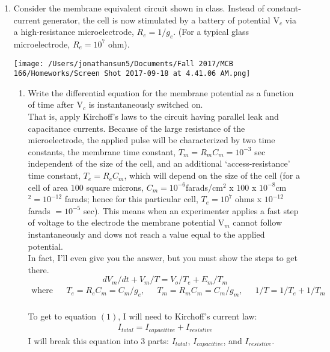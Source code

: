 \documentclass[11pt]{article}
\begin{document}
\begin{enumerate}[label=\arabic*.]
\newpage
\item
Consider the membrane equivalent circuit shown in class. Instead of constant-current generator, the cell is now stimulated by a battery of potential V$_c$ via a high-resistance microelectrode, $R_e = 1 / g_e$. (For a typical glass microelectrode, $R_e = 10^7$ ohm).
\begin{center}
\texttt{[image: /Users/jonathansun5/Documents/Fall 2017/MCB 166/Homeworks/Screen Shot 2017-09-18 at 4.41.06 AM.png]}
\end{center}
\begin{enumerate}[label=(\alph*)]
\item
Write the differential equation for the membrane potential as a function of time after V$_c$ is instantaneously switched on.
\vspace*{1\baselineskip}
\\
That is, apply Kirchoff's laws to the circuit having parallel leak and capacitance currents. Because of the large resistance of the microelectrode, the applied pulse will be characterized by two time constants, the membrane time constant, $T_m = R_mC_m = 10^{-3}$ sec independent of the size of the cell, and an additional `access-resistance' time constant, $T_e = R_eC_m$, which will depend on the size of the cell (for a cell of area $100$ square microns, $C_m = 10^{-6}$farads/cm$^2$ x $100$ x $10^{-8}$cm$^2 = 10^{-12}$ farads; hence for this particular cell, $T_e = 10^7$ ohms x $10^{-12}$ farads $= 10^{-5}$ sec). This means when an experimenter applies a fast step of voltage to the electrode the membrane potential V$_m$ cannot follow instantaneously and dows not reach a value equal to the applied potential.
\vspace*{1\baselineskip}
\\
In fact, I'll even give you the answer, but you must show the steps to get there. \\
\begin{equation}
\label{eq:1}
dV_m / dt + V_m / T = V_o / T_e + E_m / T_m
\end{equation}
\begin{align*}
\text{where} && T_e = R_eC_m = C_m / g_e \text{,} && T_m = R_mC_m = C_m / g_m \text{,} && 1/T = 1/T_e + 1/T_m
\end{align*}
\vspace*{1\baselineskip}
\\
To get to equation $(1)$, I will need to Kirchoff's current law:
\begin{align*}
I_{total} = I_{capacitive} + I_{resistive}
\end{align*}
I will break this equation into $3$ parts: $I_{total}$, $I_{capacitive}$, and $I_{resistive}$. \\


\end{enumerate}
\end{enumerate}
\end{document}
